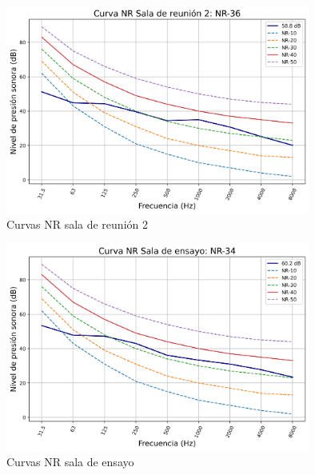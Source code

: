     \begin{figure}[H]
        \centering
        \includegraphics[width=10cm]{Imagenes/Resultados/Curvas NC-NR/NR reunion 2.png}
        \caption{Curvas NR sala de reunión 2}
        \label{fig: Curvas NR sala 2}
    \end{figure}

    \begin{figure}[H]
        \centering
        \includegraphics[width=10cm]{Imagenes/Resultados/Curvas NC-NR/NR ensayo.png}
        \caption{Curvas NR sala de ensayo}
        \label{fig: Curvas NR sala de ensayo}
    \end{figure}